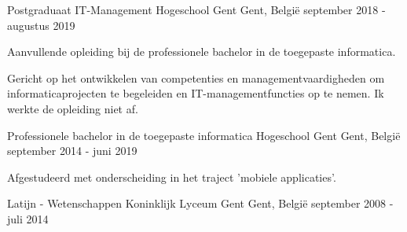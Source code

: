 


\begin{cventries}

\cventry
{Postgraduaat IT-Management} %
{Hogeschool Gent} %
{Gent, België} %
{september 2018 - augustus 2019} %
{ %
\begin{cvitems}
\item {Aanvullende opleiding bij de professionele bachelor in de toegepaste informatica.} 
\item{Gericht op het ontwikkelen van competenties en managementvaardigheden om informaticaprojecten te begeleiden en IT-managementfuncties op te nemen. Ik werkte de opleiding niet af.}
\end{cvitems}
}



\cventry
{Professionele bachelor in de toegepaste informatica} %
{Hogeschool Gent} %
{Gent, België} %
{september 2014 - juni 2019} %
{ %
\begin{cvitems}
\item {Afgestudeerd met onderscheiding in het traject 'mobiele applicaties'.}
\end{cvitems}
}

\cventry
{Latijn - Wetenschappen} %
{Koninklijk Lyceum Gent} %
{Gent, België} %
{september 2008 - juli 2014} %
{ %
}


\end{cventries}